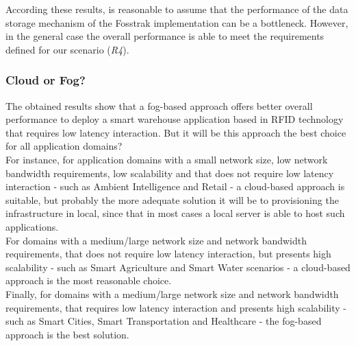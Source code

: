 According these results, is reasonable to assume that the performance of the data storage mechanism of
the Fosstrak implementation can be a bottleneck. However, in the general case the overall performance
is able to meet the requirements defined for our scenario (\textit{R4}).

\subsubsection{Cloud or Fog?}
\label{subs:eval_conclusion}
The obtained results show that a fog-based approach offers better overall performance to deploy a
smart warehouse application based in \gls{RFID} technology that requires low latency interaction.
But it will be this approach the best choice for all application domains?\\

For instance, for application domains with a small network size, low network bandwidth requirements,
low scalability and that does not require low latency interaction - such as Ambient Intelligence and
Retail - a cloud-based approach is suitable, but probably the more adequate solution it will be to
provisioning the infrastructure in local, since that in most cases a local server is able to host
such applications.\\

For domains with a medium/large network size and network bandwidth requirements, that does not require
low latency interaction, but presents high scalability - such as Smart Agriculture and Smart Water
scenarios - a cloud-based approach is the most reasonable choice.\\

Finally, for domains with a medium/large network size and network bandwidth requirements, that requires
low latency interaction and presents high scalability - such as Smart Cities, Smart Transportation and
Healthcare - the fog-based approach is the best solution.
